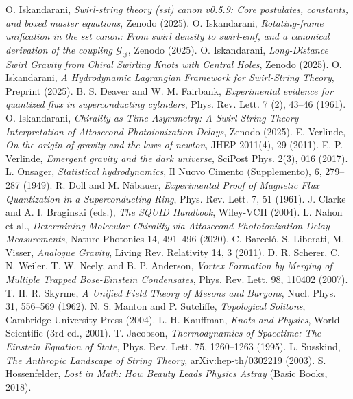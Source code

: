 \documentclass[10pt,reprint,aps,onecolumn,nofootinbib]{revtex4-2}
\begin{document}
    \begin{thebibliography}{99}
     O. Iskandarani, \emph{Swirl-string theory (sst) canon v0.5.9: Core postulates, constants, and boxed master equations}, Zenodo (2025).
     O. Iskandarani, \emph{Rotating-frame unification in the sst canon: From swirl density to swirl-emf, and a canonical derivation of the coupling $\mathcal{G}_{\circlearrowleft}$}, Zenodo (2025).
     O. Iskandarani, \emph{Long-Distance Swirl Gravity from Chiral Swirling Knots with Central Holes}, Zenodo (2025).
     O. Iskandarani, \emph{A Hydrodynamic Lagrangian Framework for Swirl-String Theory}, Preprint (2025).
     B. S. Deaver and W. M. Fairbank, \emph{Experimental evidence for quantized flux in superconducting cylinders}, Phys. Rev. Lett. 7 (2), 43--46 (1961).
     O. Iskandarani, \emph{Chirality as Time Asymmetry: A Swirl-String Theory Interpretation of Attosecond Photoionization Delays}, Zenodo (2025).
     E. Verlinde, \emph{On the origin of gravity and the laws of newton}, JHEP 2011(4), 29 (2011).
     E. P. Verlinde, \emph{Emergent gravity and the dark universe}, SciPost Phys. 2(3), 016 (2017).
     L. Onsager, \emph{Statistical hydrodynamics}, Il Nuovo Cimento (Supplemento), 6, 279--287 (1949).
     R. Doll and M. Näbauer, \emph{Experimental Proof of Magnetic Flux Quantization in a Superconducting Ring}, Phys. Rev. Lett. 7, 51 (1961).
     J. Clarke and A. I. Braginski (eds.), \emph{The SQUID Handbook}, Wiley-VCH (2004).
     L. Nahon et al., \emph{Determining Molecular Chirality via Attosecond Photoionization Delay Measurements}, Nature Photonics 14, 491–496 (2020).
     C. Barceló, S. Liberati, M. Visser, \emph{Analogue Gravity}, Living Rev. Relativity 14, 3 (2011).
     D. R. Scherer, C. N. Weiler, T. W. Neely, and B. P. Anderson, \emph{Vortex Formation by Merging of Multiple Trapped Bose-Einstein Condensates}, Phys. Rev. Lett. 98, 110402 (2007).
     T. H. R. Skyrme, \emph{A Unified Field Theory of Mesons and Baryons}, Nucl. Phys. 31, 556–569 (1962).
     N. S. Manton and P. Sutcliffe, \emph{Topological Solitons}, Cambridge University Press (2004).
     L. H. Kauffman, \emph{Knots and Physics}, World Scientific (3rd ed., 2001).
     T. Jacobson, \emph{Thermodynamics of Spacetime: The Einstein Equation of State}, Phys. Rev. Lett. 75, 1260–1263 (1995).
     L. Susskind, \emph{The Anthropic Landscape of String Theory}, arXiv:hep-th/0302219 (2003).
     S. Hossenfelder, \emph{Lost in Math: How Beauty Leads Physics Astray} (Basic Books, 2018).




    \end{thebibliography}
\end{document}
